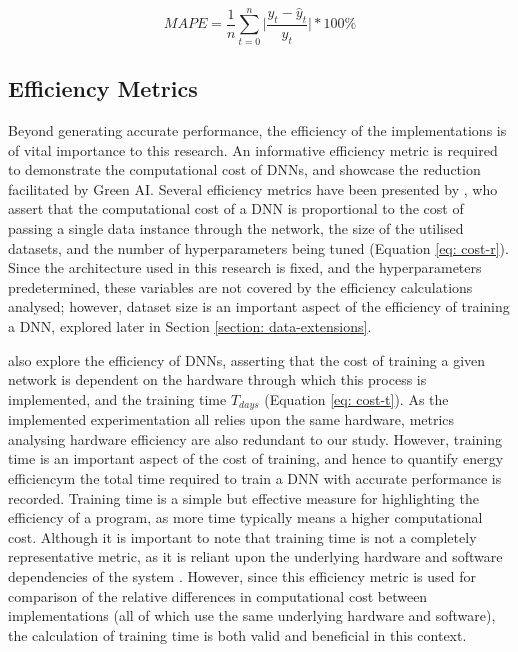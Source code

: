 \documentclass[a4paper, 11pt]{report}
\begin{document}
    \begin{equation}
        \label{eq: mape}
        MAPE = \frac{1}{n} \sum_{t=0}^n \bigg\lvert \frac{y_t - \hat{y}_t}{y_t} \bigg\lvert * 100\%
    \end{equation}


    \subsection{Efficiency Metrics}
    \label{section: efficiency-metrics}

    Beyond generating accurate performance, the efficiency of the implementations is of vital importance to this research. An informative efficiency metric is required to demonstrate the computational cost of DNNs, and showcase the reduction facilitated by Green AI. Several efficiency metrics have been presented by \citet{schwartz-2019}, who assert that the computational cost of a DNN is proportional to the cost of passing a single data instance through the network, the size of the utilised datasets, and the number of hyperparameters being tuned (Equation \ref{eq: cost-r}). Since the architecture used in this research is fixed, and the hyperparameters predetermined, these variables are not covered by the efficiency calculations analysed; however, dataset size is an important aspect of the efficiency of training a DNN, explored later in Section \ref{section: data-extensions}.

    \citet{amodei-2018} also explore the efficiency of DNNs, asserting that the cost of training a given network is dependent on the hardware through which this process is implemented, and the training time $T_{days}$ (Equation \ref{eq: cost-t}). As the implemented experimentation all relies upon the same hardware, metrics analysing hardware efficiency are also redundant to our study. However, training time is an important aspect of the cost of training, and hence to quantify energy efficiencym the total time required to train a DNN with accurate performance is recorded. Training time is a simple but effective measure for highlighting the efficiency of a program, as more time typically means a higher computational cost. Although it is important to note that training time is not a completely representative metric, as it is reliant upon the underlying hardware and software dependencies of the system \citep{schwartz-2019}. However, since this efficiency metric is used for comparison of the relative differences in computational cost between implementations (all of which use the same underlying hardware and software), the calculation of training time is both valid and beneficial in this context.
\end{document}
